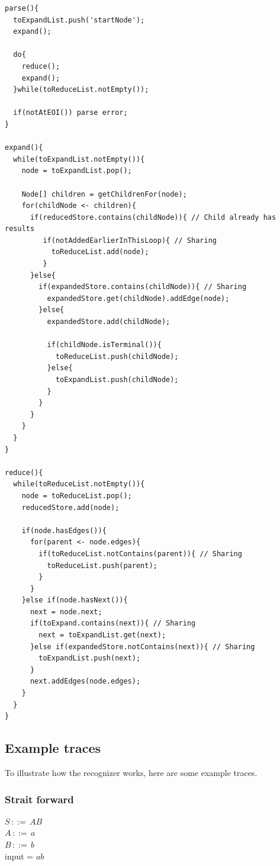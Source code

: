 \documentclass[a4paper,10pt]{article}
\begin{document}
{\small
\begin{verbatim}
parse(){
  toExpandList.push('startNode');
  expand();
  
  do{
    reduce();
    expand();
  }while(toReduceList.notEmpty());
  
  if(notAtEOI()) parse error;
}

expand(){
  while(toExpandList.notEmpty()){
    node = toExpandList.pop();
    
    Node[] children = getChildrenFor(node);
    for(childNode <- children){
      if(reducedStore.contains(childNode)){ // Child already has results
         if(notAddedEarlierInThisLoop){ // Sharing
           toReduceList.add(node);
         }
      }else{
        if(expandedStore.contains(childNode)){ // Sharing
          expandedStore.get(childNode).addEdge(node);
        }else{
          expandedStore.add(childNode);
          
          if(childNode.isTerminal()){
            toReduceList.push(childNode);
          }else{
            toExpandList.push(childNode);
          }
        }
      }
    }
  }
}

reduce(){
  while(toReduceList.notEmpty()){
    node = toReduceList.pop();
    reducedStore.add(node);
    
    if(node.hasEdges()){
      for(parent <- node.edges){
        if(toReduceList.notContains(parent)){ // Sharing
          toReduceList.push(parent);
        }
      }
    }else if(node.hasNext()){
      next = node.next;
      if(toExpand.contains(next)){ // Sharing
        next = toExpandList.get(next);
      }else if(expandedStore.notContains(next)){ // Sharing
        toExpandList.push(next);
      }
      next.addEdges(node.edges);
    }
  }
}
\end{verbatim}
}

\subsection{Example traces}

To illustrate how the recognizer works, here are some example traces.

\subsubsection{Strait forward}
$S\,::=\,AB$\\
$A\,::=\,a$\\
$B\,::=\,b$\\
input = $ab$
\end{document}

